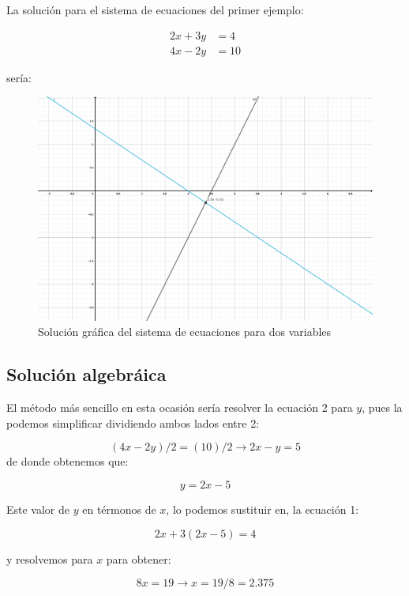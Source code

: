 \documentclass[
]{book}
\begin{document}
La solución para el sistema de ecuaciones del primer ejemplo:

\begin{align}
2x + 3y & = 4\\
4x - 2y & =10
\end{align}

sería:

\begin{figure}

{\centering \includegraphics[width=41.67in]{Unidad-V/Soln-grafica-1} 

}

\caption{Solución gráfica del sistema de ecuaciones para dos variables}\label{fig:unnamed-chunk-41}
\end{figure}

\hypertarget{soluciuxf3n-algebruxe1ica}{%
\subsection{Solución algebráica}\label{soluciuxf3n-algebruxe1ica}}

El método más sencillo en esta ocasión sería resolver la ecuación 2 para \(y\), pues la podemos simplificar dividiendo ambos lados entre 2:

\[ (4x - 2y)/2 = (10)/2 \rightarrow 2x - y = 5\]
de donde obtenemos que:

\[y = 2x-5\]

Este valor de \(y\) en térmonos de \(x\), lo podemos sustituir en, la ecuación 1:

\[2x+3(2x-5) = 4\]

y resolvemos para \(x\) para obtener:

\[8x = 19 \rightarrow x = 19/8=2.375\]
\end{document}
